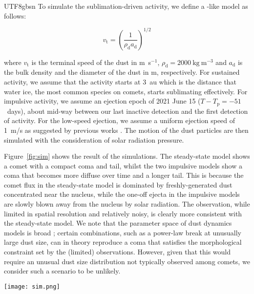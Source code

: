 \documentclass[modern]{aastex631}
\begin{document}
\begin{CJK*}{UTF8}{gbsn}
To simulate the sublimation-driven activity, we define a \citet{Whipple1951}-like model as follows:

\begin{equation}
    v_\mathrm{t} = \left( \frac{1}{\rho_\mathrm{d} a_\mathrm{d}} \right)^{1/2}
\end{equation}

\noindent where $v_\mathrm{t}$ is the terminal speed of the dust in m~s$^{-1}$, $\rho_\mathrm{d}=2000~\mathrm{kg~m^{-3}}$ and $a_\mathrm{d}$ is the bulk density and the diameter of the dust in m, respectively. For sustained activity, we assume that the activity starts at 3~au which is the distance that water ice, the most common species on comets, starts sublimating effectively. For impulsive activity, we assume an ejection epoch of 2021 June 15 ($T-T_\mathrm{p}=-51$~days), about mid-way between our last inactive detection and the first detection of activity. For the low-speed ejection, we assume a uniform ejection speed of 1~m/s as suggested by previous works \citep[cf.][Figure~18]{Jewitt2015}. The motion of the dust particles are then simulated with the consideration of solar radiation pressure.

Figure~\ref{fig:sim} shows the result of the simulations. The steady-state model shows a comet with a compact coma and tail, whilst the two impulsive models show a coma that becomes more diffuse over time and a longer tail. This is because the comet flux in the steady-state model is dominated by freshly-generated dust concentrated near the nucleus, while the one-off ejecta in the impulsive models are slowly blown away from the nucleus by solar radiation. The observation, while limited in spatial resolution and relatively noisy, is clearly more consistent with the steady-state model. We note that the parameter space of dust dynamics models is broad \citep[e.g.][]{Ishiguro2009}; certain combinations, such as a power-law break at unusually large dust size, can in theory reproduce a coma that satisfies the morphological constraint set by the (limited) observations. However, given that this would require an unusual dust size distribution not typically observed among comets, we consider such a scenario to be unlikely.

\begin{figure*}
\begin{center}
\texttt{[image: sim.png]}
\caption{Observed (from Fig.~\ref{fig:mosaic}) and simulated images of P/2021 HS on 2021 July 10 and August 1 under different activity scenarios (see main text). Images on each row have the same photometric scale. \label{fig:sim}}
\end{center}
\end{figure*}


\end{CJK*}
\end{document}

